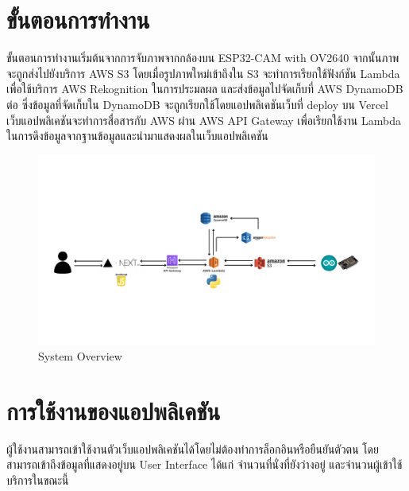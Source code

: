 \section{ขั้นตอนการทำงาน}
ขั้นตอนการทำงานเริ่มต้นจากการจับภาพจากกล้องบน ESP32-CAM with OV2640 จากนั้นภาพจะถูกส่งไปยังบริการ AWS S3 โดยเมื่อรูปภาพใหม่เข้าถึงใน S3 จะทำการเรียกใช้ฟังก์ชัน Lambda เพื่อใช้บริการ AWS Rekognition ในการประมลผล และส่งข้อมูลไปจัดเก็บที่ AWS DynamoDB ต่อ ซึ่งข้อมูลที่จัดเก็บใน DynamoDB จะถูกเรียกใช้โดยแอปพลิเคชันเว็บที่ deploy บน Vercel 
เว็บแอปพลิเคชันจะทำการสื่อสารกับ AWS ผ่าน AWS API Gateway เพื่อเรียกใช้งาน Lambda ในการดึงข้อมูลจากฐานข้อมูลและนำมาแสดงผลในเว็บแอปพลิเคชัน
\begin{figure}[h]
\centering
\includegraphics[width=\textwidth]{images/System Diagram.png}
\caption[System Overview]{System Overview}
\label{fig:System}
\end{figure}

\section{การใช้งานของแอปพลิเคชัน}
ผู้ใช้งานสามารถเข้าใช้งานตัวเว็บแอปพลิเคชันได้โดยไม่ต้องทำการล็อกอินหรือยืนยันตัวตน โดยสามารถเข้าถึงข้อมูลที่แสดงอยู่บน User Interface ได้แก่ จำนวนที่นั่งที่ยังว่างอยู่ และจำนวนผู้เข้าใช้บริการในขณะนี้ 

